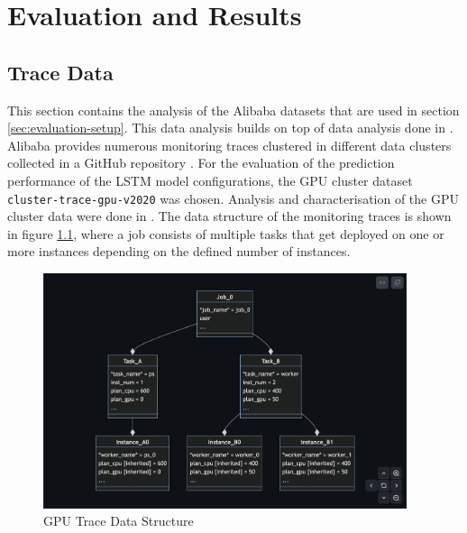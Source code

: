 \chapter{Evaluation and Results}
\label{ch:evaluation-and-results}

\section{Trace Data}
\label{sec:data-analysis-evaluation}

  This section contains the analysis of the Alibaba datasets that are used in section \ref{sec:evaluation-setup}. This data analysis builds on top of data analysis done in \cite{fengcunDeepJSJobScheduling2023}.
  Alibaba provides numerous monitoring traces clustered in different data clusters collected in a GitHub repository \cite{wengAlibabaClusterTrace2023}.
  For the evaluation of the prediction performance of the LSTM model configurations, the GPU cluster dataset \texttt{cluster-trace-gpu-v2020} was chosen. Analysis and characterisation of the GPU cluster data were done in \cite{wengMLaaSWildWorkload2022}.
  The data structure of the monitoring traces is shown in figure \ref{fig:gpu-trace-data-structure}, where a job consists of multiple tasks that get deployed on one or more instances depending on the defined number of instances.

  \begin{figure}
    \centering
    \includegraphics[width=0.95\textwidth]{figures/gpu_dataset_structure.png}
    \caption{GPU Trace Data Structure \cite{wengClusterdataClustertracegpuv2020Master}}
    \label{fig:gpu-trace-data-structure}
  \end{figure}
  


